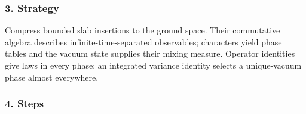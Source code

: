 \documentclass[
  letterpaper,
  11pt]{article}
\begin{document}
\subsubsection{3. Strategy}\label{strategy-20}

Compress bounded slab insertions to the ground space. Their commutative
algebra describes infinite-time-separated observables; characters yield
phase tables and the vacuum state supplies their mixing measure.
Operator identities give laws in every phase; an integrated variance
identity selects a unique-vacuum phase almost everywhere.

\subsubsection{4. Steps}\label{steps-20}
\end{document}
